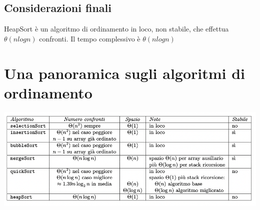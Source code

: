 \documentclass[11pt, oneside]{article}   	%
\begin{document}
\subsection*{Considerazioni finali}
HeapSort è un algoritmo di ordinamento in loco, non stabile, che effettua $\theta(nlogn)$ confronti. Il tempo complessivo è  $\theta(nlogn)$

\section*{Una panoramica sugli algoritmi di ordinamento}
\begin{center}
\includegraphics[scale=0.9]{riassunto}
\end{center}
\end{document}

